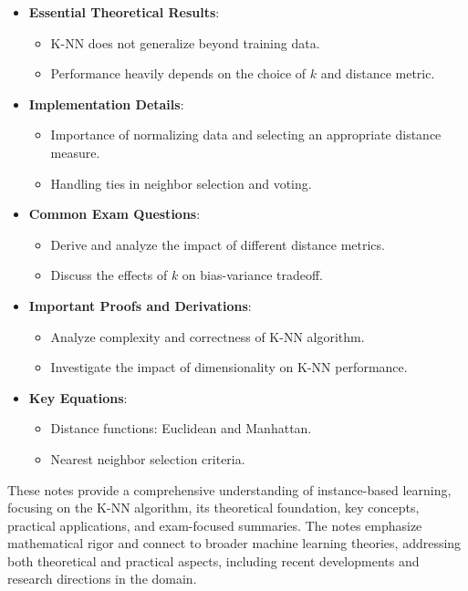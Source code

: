 \documentclass[
  12pt,
]{report}
\providecommand{\tightlist}{%
  \setlength{\itemsep}{0pt}\setlength{\parskip}{0pt}}
\begin{document}
\begin{itemize}
\tightlist
\item
  \textbf{Essential Theoretical Results}:

  \begin{itemize}
  \tightlist
  \item
    K-NN does not generalize beyond training data.
  \item
    Performance heavily depends on the choice of \(k\) and distance metric.
  \end{itemize}
\item
  \textbf{Implementation Details}:

  \begin{itemize}
  \tightlist
  \item
    Importance of normalizing data and selecting an appropriate distance measure.
  \item
    Handling ties in neighbor selection and voting.
  \end{itemize}
\item
  \textbf{Common Exam Questions}:

  \begin{itemize}
  \tightlist
  \item
    Derive and analyze the impact of different distance metrics.
  \item
    Discuss the effects of \(k\) on bias-variance tradeoff.
  \end{itemize}
\item
  \textbf{Important Proofs and Derivations}:

  \begin{itemize}
  \tightlist
  \item
    Analyze complexity and correctness of K-NN algorithm.
  \item
    Investigate the impact of dimensionality on K-NN performance.
  \end{itemize}
\item
  \textbf{Key Equations}:

  \begin{itemize}
  \tightlist
  \item
    Distance functions: Euclidean and Manhattan.
  \item
    Nearest neighbor selection criteria.
  \end{itemize}
\end{itemize}

These notes provide a comprehensive understanding of instance-based learning, focusing on the K-NN algorithm, its theoretical foundation, key concepts, practical applications, and exam-focused summaries. The notes emphasize mathematical rigor and connect to broader machine learning theories, addressing both theoretical and practical aspects, including recent developments and research directions in the domain.
\end{document}
